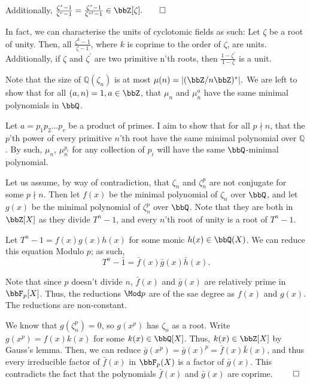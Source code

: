 \documentclass[a4paper, 12pt,oneside,openany]{book}
\begin{document}
Additionally, $\frac{\zeta^s-1}{\zeta^r-1}=\frac{\zeta^s-1}{\zeta^{st}-1}\in\bbZ[\zeta]. \qed$

In fact, we can characterise the units of cyclotomic fields as such: Let $\zeta$ be a root of unity. Then, all $\frac{\zeta^k-1}{\zeta-1}$, where $k$ is coprime to the order of $\zeta$, are units. Additionally, if $\zeta$ and $\zeta^\prime$ are two primitive n'th roots, then $\frac{1-\zeta^\prime}{1-\zeta}$ is a unit.


 Note that the size of $\mathbb{Q}(\zeta_n)$ is at most $\mu(n) = |(\bbZ/n\bbZ)^*|.$ We are left to show that for all $(a, n)=1, a\in\bbZ$, that $\mu_n$ and $\mu_n^a$ have the same minimal polynomials in $\bbQ$.

Let $a=p_1p_2\dots p_r$ be a product of primes. I aim to show that for all $p\nmid n$, that the $p$'th power of every primitive $n$'th root have the same minimal polynomial over $\mathbb{Q}$. By such, $\mu_n$, $\mu_n^{p_i}$ for any collection of $p_i$ will have the same $\bbQ$-minimal polynomial. 

Let us assume, by way of contradiction, that $\zeta_n$ and $\zeta_n^p$ are not conjugate for some $p\nmid n$. Then let $f(x)$ be the minimal polynomial of $\zeta_n$ over $\bbQ$, and let $g(x)$ be the minimal polynomial of $\zeta_n^p$ over $\bbQ$. Note that they are both in $\bbZ[X]$ as they divide $T^n-1$, and every $n$'th root of unity is a root of $T^n-1$. 

Let $T^n-1=f(x)g(x)h(x)$ for some monic $h(x) \in \bbQ(X)$. We can reduce this equation Modulo $p$; as such, $$T^n-\bar{1} = \bar{f}(x)\bar{g}(x)\bar{h}(x).$$

Note that since $p$ doesn't divide $n$, $\bar{f}(x)$ and $\bar{g}(x)$ are relatively prime in $\bbF_p[X]$. Thus, the reductions $\Mod p$ are of the sae degree as $f(x)$ and $g(x)$. The reductions are non-constant.

We know that $g(\zeta_n^p)=0$, so $g(x^p)$ has $\zeta_n$ as a root. Write $g(x^p)=f(x)k(x)$ for some $k(x) \in \bbQ[X]$. Thus, $k(x)\in\bbZ[X]$ by Gauss's lemma. Then, we can reduce $\bar{g}(x^p)=\bar{g}(x)^p=\bar{f}(x)\bar{k}(x)$, and thus every irreducible factor of $\bar{f}(x)$ in $\bbF_p(X)$ is a factor of $\bar{g}(x)$. This contradicts the fact that the polynomials $\bar{f}(x)$ and $\bar{g}(x)$ are coprime. $\qed$
\end{document}
